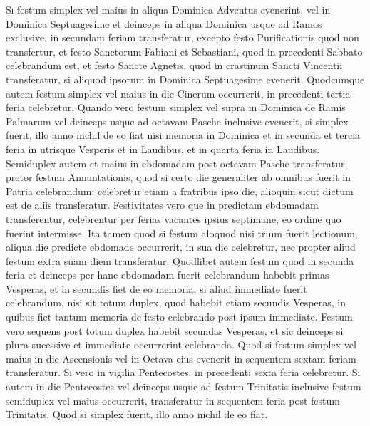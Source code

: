 \begin{multicols*}{2}
{\color{Red} }
\lettrine[lines=2]{\zallmancaps \color{Red} S}{i} festum simplex vel maius in aliqua Dominica Adventus evenerint, vel in Dominica Septuagesime et deinceps in aliqua Dominica usque ad Ramos exclusive, in secundam feriam transferatur, excepto festo Purificationis quod non transfertur, et festo Sanctorum Fabiani et Sebastiani, quod in precedenti Sabbato celebrandum est, et festo Sancte Agnetis, quod in crastinum Sancti Vincentii transferatur, si aliquod ipsorum in Dominica Septuagesime evenerit.
Quodcumque autem festum simplex vel maius in die Cinerum occurrerit, in precedenti tertia feria celebretur.
Quando vero festum simplex vel supra in Dominica de Ramis Palmarum vel deinceps usque ad octavam Pasche inclusive evenerit, si simplex fuerit, illo anno nichil de eo fiat nisi memoria in Dominica et in secunda et tercia feria in utrisque Vesperis et in Laudibus, et in quarta feria in Laudibus. Semiduplex autem et maius in ebdomadam post octavam Pasche transferatur, pretor festum Annuntationis, quod si certo die generaliter ab omnibus fuerit in Patria celebrandum: celebretur etiam a fratribus ipso die, alioquin sicut dictum est de aliis transferatur.
Festivitates vero que in predictam ebdomadam transferentur, celebrentur per ferias vacantes ipsius septimane, eo ordine quo fuerint intermisse. Ita tamen quod si festum aloquod nisi trium fuerit lectionum, aliqua die predicte ebdomade occurrerit, in sua die celebretur, nec propter aliud festum extra suam diem transferatur.
Quodlibet autem festum quod in secunda feria et deinceps per hanc ebdomadam fuerit celebrandum habebit primas Vesperas, et in secundis fiet de eo memoria, si aliud immediate fuerit celebrandum, nisi sit totum duplex, quod habebit etiam secundis Vesperas, in quibus fiet tantum memoria de festo celebrando post ipsum immediate. Festum vero sequens post totum duplex habebit secundas Vesperas, et sic deinceps si plura sucessive et immediate occurrerint celebranda.
Quod si festum simplex vel maius in die Ascensionis vel in Octava eius evenerit in sequentem sextam feriam transferatur. Si vero in vigilia Pentecostes: in precedenti sexta feria celebretur. Si autem in die Pentecostes vel deinceps usque ad festum Trinitatis inclusive festum semiduplex vel maius occurrerit, transferatur in sequentem feria post festum Trinitatis. Quod si simplex fuerit, illo anno nichil de eo fiat.


\end{multicols*}
